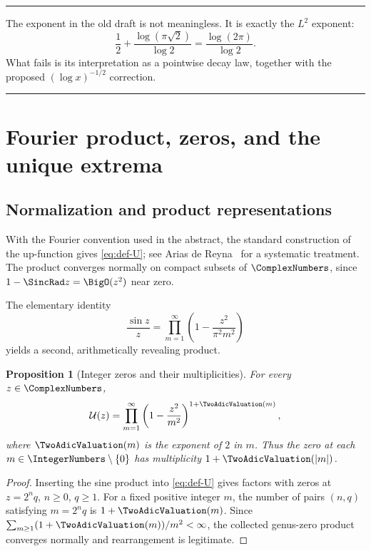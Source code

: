 \documentclass[11pt,oneside]{article}
\newtheorem{proposition}[theorem]{Proposition}
\theoremstyle{definition}
\theoremstyle{remark}
\newcommand{\Uhat}{\mathcal U}
\newenvironment{boxedremark}{%
  \par\smallskip\noindent\begin{center}\begin{minipage}{0.94\textwidth}%
  \color{black}\hrule\vspace{0.6em}\small
}{%
  \vspace{0.6em}\hrule\end{minipage}\end{center}\smallskip
}
\begin{document}
\begin{boxedremark}
The exponent in the old draft is not meaningless.  It is exactly the $L^2$ exponent:
\[
 \frac12+\frac{\log(\pi\sqrt2)}{\log2}
 =\frac{\log(2\pi)}{\log2}.
\]
What fails is its interpretation as a pointwise decay law, together with the proposed
$(\log x)^{-1/2}$ correction.
\end{boxedremark}

\section{Fourier product, zeros, and the unique extrema}

\subsection{Normalization and product representations}

With the Fourier convention used in the abstract, the standard construction of the
up-function gives \eqref{eq:def-U}; see Arias de Reyna~\cite{arias1982} for a systematic
treatment.  The product converges normally on compact subsets of $\ComplexNumbers$, since
$1-\SincRad z=\BigO(z^2)$ near zero.

The elementary identity
\[
 \frac{\sin z}{z}=\prod_{m=1}^{\infty}
 \left(1-\frac{z^2}{\pi^2m^2}\right)
\]
yields a second, arithmetically revealing product.

\begin{proposition}[Integer zeros and their multiplicities]\label{prop:zeros}
For every $z\in\ComplexNumbers$,
\begin{equation}\label{eq:weierstrass-collected}
 \Uhat(z)=\prod_{m=1}^{\infty}
 \left(1-\frac{z^2}{m^2}\right)^{1+\TwoAdicValuation(m)},
\end{equation}
where $\TwoAdicValuation(m)$ is the exponent of $2$ in $m$.  Thus the zero at each
$m\in\IntegerNumbers\setminus\{0\}$ has multiplicity $1+\TwoAdicValuation(|m|)$.
\end{proposition}

\begin{proof}
Inserting the sine product into \eqref{eq:def-U} gives factors with zeros at
$z=2^nq$, $n\ge0$, $q\ge1$.  For a fixed positive integer $m$, the number of pairs
$(n,q)$ satisfying $m=2^nq$ is $1+\TwoAdicValuation(m)$.  Since
$\sum_{m\ge1}(1+\TwoAdicValuation(m))/m^2<\infty$, the collected genus-zero product converges
normally and rearrangement is legitimate.
\end{proof}
\end{document}
